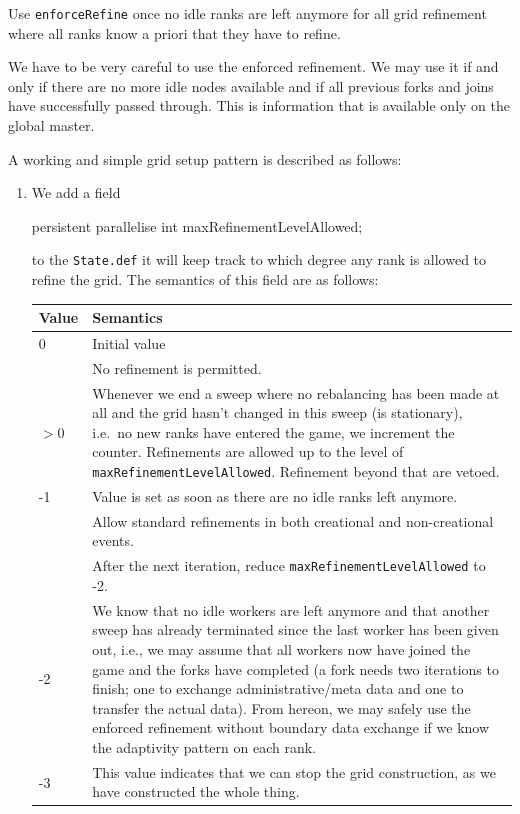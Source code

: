 \begin{solution}
Use \texttt{enforceRefine} once no idle ranks are left anymore for all grid
refinement where all ranks know a priori that they have to refine.
\end{solution}


We have to be very careful to use the enforced refinement.
We may use it if and only if there are no more idle nodes available and if all
previous forks and joins have successfully passed through. 
This is information that is available only on the global master. 

A working and simple grid setup pattern is described as follows:
\begin{enumerate}
  \item We add a field
    \begin{code}
      persistent parallelise int maxRefinementLevelAllowed;
    \end{code}
    to the \texttt{State.def} it will keep track to which degree any rank is
    allowed to refine the grid. 
    The semantics of this field are as follows:
    \begin{center}
     \begin{tabular}{lp{12cm}}
       Value & Semantics \\
       \hline
       0 & Initial value \\
         & No refinement is permitted. 
       \\
       \hline
       $>0$ & Whenever we end a sweep where no rebalancing has been made at all
       and the grid hasn't changed in this sweep (is stationary), i.e.~no new
       ranks have entered the game, we increment the counter.
       Refinements are allowed up to the level of
       \texttt{maxRefinementLevelAllowed}. Refinement beyond that are vetoed. 
       \\
       \hline
       -1 & Value is set as soon as there are no idle ranks left anymore. \\
          & Allow standard refinements in both creational and non-creational
          events. \\
          & After the next iteration, reduce \texttt{maxRefinementLevelAllowed}
          to -2.
       \\
       \hline
       -2 & We know that no idle workers are left anymore and that another sweep
       has already terminated since the last worker has been given out, i.e.,
       we may assume that all workers now have joined the game and the forks
       have completed (a fork needs two iterations to finish; one to exchange
       administrative/meta data and one to transfer the actual data). From
       hereon, we may safely use the enforced refinement without boundary data
       exchange if we know the adaptivity pattern on each rank.
       \\
       \hline
       -3 & This value indicates that we can stop the grid construction, as we
       have constructed the whole thing.
     \end{tabular}
    \end{center}


\end{enumerate}
